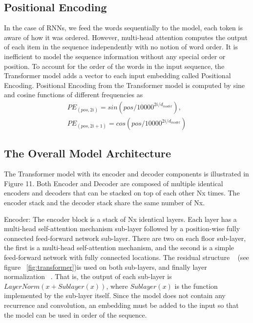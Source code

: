 \subsection{Positional Encoding}
In the case of RNNs, we feed the words sequentially to the model, each token is aware of how it was ordered. However, multi-head attention computes the output of each item in the sequence independently with no notion of word order. It is inefficient to model the sequence information without any special order or position. To account for the order of the words in the input sequence, the Transformer model adds a vector to each input embedding called Positional Encoding. Positional Encoding from the Transformer model is computed by sine and cosine functions of different frequencies as 
\begin{equation}
	\begin{aligned}
	PE_{(pos,2i)} = sin(pos/10000^{2i/d_{model}}),\\
	PE_{(pos,2i+1)} = cos(pos/10000^{2i/d_{model}})
	\end{aligned}
	\label{equ:position_embedding}
\end{equation}

\subsection{The Overall Model Architecture}
The Transformer model with its encoder and decoder components is illustrated in Figure 11. Both Encoder and Decoder are composed of multiple identical encoders and decoders that can be stacked on top of each other Nx times. The encoder stack and the decoder stack share the same number of Nx.

Encoder: The encoder block is a stack of Nx identical layers. Each layer has a multi-head self-attention mechanism sub-layer followed by a position-wise fully connected feed-forward network sub-layer. There are two on each floor sub-layer, the first is a multi-head self-attention mechanism, and the second is a simple feed-forward network with fully connected locations. The residual structure ~\cite{He_2016_CVPR} (see figure ~\ref{fig:transformer})is used on both sub-layers, and finally layer normalization ~\cite{ba2016layer}. That is, the output of each sub-layer is $LayerNorm(x + Sublayer(x))$, where $Sublayer(x)$ is the function implemented by the sub-layer itself. Since the model does not contain any recurrence and convolution, an embedding must be added to the input so that the model can be used in order of the sequence.

